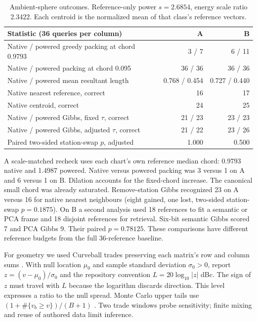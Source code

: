 \documentclass[11pt,a4paper]{article}
\begin{document}
\begin{table}[ht]
\centering
\begin{tabular}{@{}lrr@{}}
\toprule
Statistic (36 queries per column)&A&B\\ \midrule
Native / powered greedy packing at chord 0.9793&3 / 7&6 / 11\\
Native / powered packing at chord 0.095&36 / 36&36 / 36\\
Native / powered mean resultant length&0.768 / 0.454&0.727 / 0.440\\
Native nearest reference, correct&16&17\\
Native centroid, correct&24&25\\
Native / powered Gibbs, fixed $\tau$, correct&21 / 23&23 / 23\\
Native / powered Gibbs, adjusted $\tau$, correct&21 / 22&23 / 26\\
Paired two-sided station-swap $p$, adjusted&1.000&0.500\\
\bottomrule
\end{tabular}
\caption{Ambient-sphere outcomes. Reference-only power $s=2.6854$, energy scale ratio 2.3422. Each centroid is the normalized mean of that class's reference vectors.}
\end{table}
A scale-matched recheck uses each chart's own reference median chord: 0.9793 native and 1.4987 powered. Native versus powered packing was 3 versus 1 on A and 6 versus 1 on B. Dilation accounts for the fixed-chord increase. The canonical small chord was already saturated. Remove-station Gibbs recognized 23 on A versus 16 for native nearest neighbours (eight gained, one lost, two-sided station-swap $p=0.1875$). On B a second analysis used 18 references to fit a semantic or PCA frame and 18 disjoint references for retrieval. Six-bit semantic Gibbs scored 7 and PCA Gibbs 9. Their paired $p=0.78125$. These comparisons have different reference budgets from the full 36-reference baseline.

For geometry we used Curveball trades preserving each matrix's row and column sums \citep{strona,carstens}. With null location $\mu_0$ and sample standard deviation $\sigma_0>0$, report $z=(v-\mu_0)/\sigma_0$ and the repository convention $L=20\log_{10}|z|$ dBc. The sign of $z$ must travel with $L$ because the logarithm discards direction. This level expresses a ratio to the null spread. Monte Carlo upper tails use $(1+\#\{v_b\ge v\})/(B+1)$ \citep{phipson}. Two trade windows probe sensitivity; finite mixing and reuse of authored data limit inference.
\end{document}
